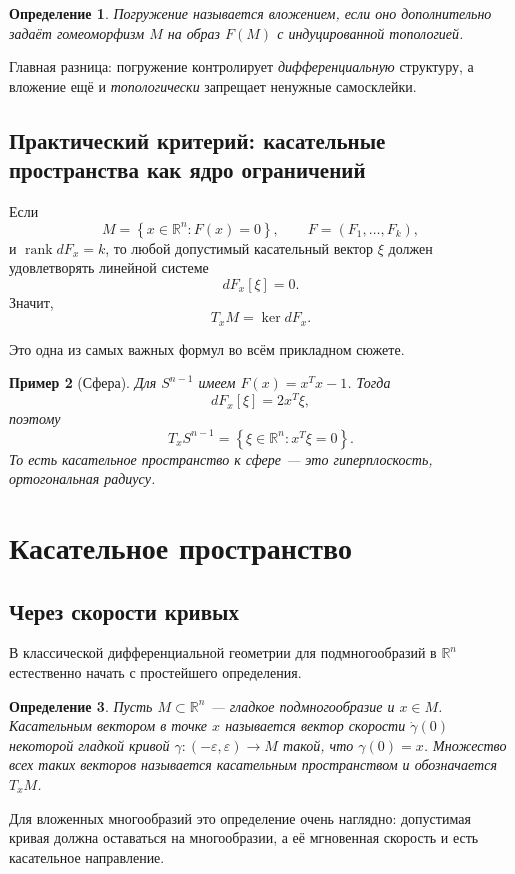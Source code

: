 \documentclass[12pt,a4paper]{article}
\theoremstyle{rudef}
\newtheorem{definition}{Определение}[section]
\newtheorem{example}[definition]{Пример}
\theoremstyle{ruplain}
\newcommand{\R}{\mathbb{R}}
\newcommand{\rank}{\operatorname{rank}}
\newcommand{\set}[1]{\left\{#1\right\}}
\begin{document}
\begin{definition}
Погружение называется \emph{вложением}, если оно дополнительно задаёт гомеоморфизм $M$ на образ $F(M)$ с индуцированной топологией.
\end{definition}

Главная разница: погружение контролирует \emph{дифференциальную} структуру, а вложение ещё и \emph{топологически} запрещает ненужные самосклейки.

\subsection{Практический критерий: касательные пространства как ядро ограничений}

Если
\[
M=\set{x\in \R^n:F(x)=0}, \qquad F=(F_1,\dots,F_k),
\]
и $\rank dF_x=k$, то любой допустимый касательный вектор $\xi$ должен удовлетворять линейной системе
\[
dF_x[\xi]=0.
\]
Значит,
\[
T_xM=\ker dF_x.
\]

Это одна из самых важных формул во всём прикладном сюжете.

\begin{example}[Сфера]
Для $S^{n-1}$ имеем $F(x)=x^Tx-1$. Тогда
\[
dF_x[\xi]=2x^T\xi,
\]
поэтому
\[
T_xS^{n-1}=\set{\xi\in \R^n: x^T\xi=0}.
\]
То есть касательное пространство к сфере --- это гиперплоскость, ортогональная радиусу.
\end{example}

\section{Касательное пространство}

\subsection{Через скорости кривых}

В классической дифференциальной геометрии для подмногообразий в $\R^n$ естественно начать с простейшего определения.

\begin{definition}
Пусть $M\subset \R^n$ --- гладкое подмногообразие и $x\in M$. Касательным вектором в точке $x$ называется вектор скорости $\dot \gamma(0)$ некоторой гладкой кривой $\gamma:(-\varepsilon,\varepsilon)\to M$ такой, что $\gamma(0)=x$. Множество всех таких векторов называется \emph{касательным пространством} и обозначается $T_xM$.
\end{definition}

Для вложенных многообразий это определение очень наглядно: допустимая кривая должна оставаться на многообразии, а её мгновенная скорость и есть касательное направление.
\end{document}
